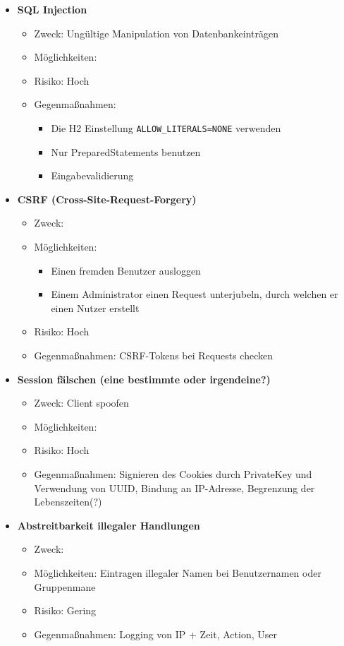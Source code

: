 \documentclass[12pt,DIV14,BCOR10mm,a4paper,parskip=half-,headsepline,headinclude,english,ngerman,bibliography=totocnumbered]{scrreprt}
\begin{document}
\begin{itemize}
  \item \textbf{SQL Injection}
  \begin{itemize}
  \item Zweck: Ungültige Manipulation von Datenbankeinträgen
  \item Möglichkeiten:
  \item Risiko: Hoch
  \item Gegenmaßnahmen:
  \begin{itemize}
    \item Die H2 Einstellung \texttt{ALLOW\_LITERALS=NONE} verwenden
    \item Nur PreparedStatements benutzen
    \item Eingabevalidierung
  \end{itemize}
  \end{itemize}

  \item \textbf{CSRF (Cross-Site-Request-Forgery)}
  \begin{itemize}
  \item Zweck:
  \item Möglichkeiten:
  \begin{itemize}
          \item Einen fremden Benutzer ausloggen
          \item Einem Administrator einen Request unterjubeln, durch welchen er einen Nutzer erstellt
      \end{itemize}
  \item Risiko: Hoch
  \item Gegenmaßnahmen: CSRF-Tokens bei Requests checken
  \end{itemize}

  \item \textbf{Session fälschen (eine bestimmte oder irgendeine?)}
  \begin{itemize}
  \item Zweck: Client spoofen
  \item Möglichkeiten:
  \item Risiko: Hoch
  \item Gegenmaßnahmen: Signieren des Cookies durch PrivateKey und Verwendung von UUID, Bindung an IP-Adresse, Begrenzung der Lebenszeiten(?)
  \end{itemize}

  \item \textbf{Abstreitbarkeit illegaler Handlungen}
  \begin{itemize}
  \item Zweck:
  \item Möglichkeiten: Eintragen illegaler Namen bei Benutzernamen oder Gruppenmane
  \item Risiko: Gering
  \item Gegenmaßnahmen: Logging von IP + Zeit, Action, User
  \end{itemize}


\end{itemize}
\end{document}
